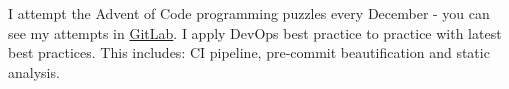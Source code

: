\descript{ }
\vspace*{-\topsep}  %
\begin{justify}
I attempt the Advent of Code programming puzzles every December - you can see my attempts in \href{https://gitlab.com/laywill/}{GitLab}.
I apply DevOps best practice to practice with latest best practices. This includes: CI pipeline, pre-commit beautification and static analysis.
\end{justify}